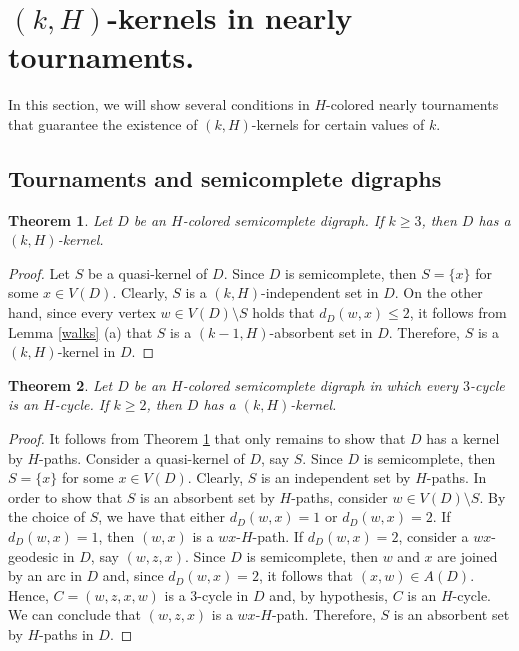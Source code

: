 \documentclass[10pt,a4paper]{article}
\newtheorem{theorem}{Theorem}[section]
\begin{document}
\section{$(k,H)$-kernels in nearly tournaments.}

In this section, we will show several conditions in $H$-colored nearly tournaments that guarantee the existence of $(k,H)$-kernels for certain values of $k$.

\subsection{Tournaments and semicomplete digraphs}

\begin{theorem}
\label{tour1}
Let $D$ be an $H$-colored semicomplete digraph. If $k \geq 3$, then $D$ has a $(k,H)$-kernel.
\end{theorem}
\begin{proof}
Let $S$ be a quasi-kernel of $D$. Since $D$ is semicomplete, then $S=\{ x \}$ for some $x \in V(D)$. Clearly, $S$ is a $(k,H)$-independent set in $D$. On the other hand, since every vertex $w \in V(D) \setminus S$ holds that $d_{D}(w,x) \leq 2$, it follows from Lemma \ref{walks} (a) that  $S$ is a $(k-1,H)$-absorbent set in $D$. Therefore, $S$ is a $(k,H)$-kernel in $D$.
\end{proof}

\begin{theorem}
\label{tour2}
Let $D$ be an $H$-colored semicomplete digraph in which every $3$-cycle is an $H$-cycle. If $k \geq 2$, then $D$ has a  $(k,H)$-kernel.
\end{theorem}
\begin{proof}
It follows from Theorem \ref{tour1} that only remains to show that $D$ has a kernel by $H$-paths. Consider a quasi-kernel of $D$, say $S$.  Since $D$ is semicomplete, then $S=\{ x \}$ for some $x \in V(D)$. 
Clearly, $S$ is an independent set by $H$-paths. 
In order to show that $S$ is an absorbent set by $H$-paths, consider $w \in V(D) \setminus S$.
By the choice of $S$, we have that either $d_{D}(w,x)=1$ or $d_{D}(w,x)=2$.  If $d_{D}(w,x)=1$, then $(w,x)$ is a $wx$-$H$-path. If $d_{D}(w,x)=2$, consider a $wx$-geodesic in $D$, say $(w,z,x)$. Since $D$ is semicomplete, then $w$ and $x$ are joined by an arc in $D$ and, since $d_{D}(w,x)=2$, it follows that $(x,w) \in A(D)$. Hence, $C=(w,z,x,w)$ is a $3$-cycle in $D$ and, by hypothesis, $C$ is an $H$-cycle. We can conclude that $(w,z,x)$ is a $wx$-$H$-path. Therefore, $S$ is an absorbent set by $H$-paths in $D$.
\end{proof}
\end{document}
